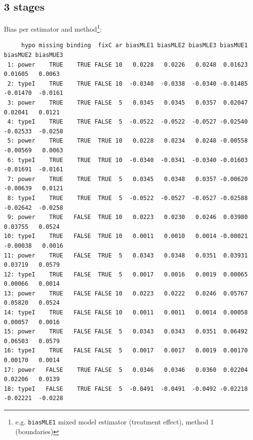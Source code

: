 \documentclass[12pt]{article}
\begin{document}
\subsection{3 stages}
\label{sec:org22a4fe3}
Bias per estimator and method\footnote{e.g. \texttt{biasMLE1} mixed model
estimator (treatment effect), method 1 (boundaries)}:
\begin{adjustwidth}{-1cm}{-1cm}
\begin{verbatim}
     hypo missing binding  fixC ar biasMLE1 biasMLE2 biasMLE3 biasMUE1 biasMUE2 biasMUE3
 1: power    TRUE    TRUE FALSE 10   0.0228   0.0226   0.0248  0.01623  0.01605   0.0063
 2: typeI    TRUE    TRUE FALSE 10  -0.0340  -0.0338  -0.0340 -0.01485 -0.01470  -0.0161
 3: power    TRUE    TRUE FALSE  5   0.0345   0.0345   0.0357  0.02047  0.02041   0.0121
 4: typeI    TRUE    TRUE FALSE  5  -0.0522  -0.0522  -0.0527 -0.02540 -0.02533  -0.0258
 5: power    TRUE    TRUE  TRUE 10   0.0228   0.0234   0.0248 -0.00558 -0.00569   0.0063
 6: typeI    TRUE    TRUE  TRUE 10  -0.0340  -0.0341  -0.0340 -0.01603 -0.01691  -0.0161
 7: power    TRUE    TRUE  TRUE  5   0.0345   0.0348   0.0357 -0.00620 -0.00639   0.0121
 8: typeI    TRUE    TRUE  TRUE  5  -0.0522  -0.0527  -0.0527 -0.02588 -0.02642  -0.0258
 9: power    TRUE   FALSE  TRUE 10   0.0223   0.0230   0.0246  0.03980  0.03755   0.0524
10: typeI    TRUE   FALSE  TRUE 10   0.0011   0.0010   0.0014 -0.00021 -0.00038   0.0016
11: power    TRUE   FALSE  TRUE  5   0.0343   0.0348   0.0351  0.03931  0.03719   0.0579
12: typeI    TRUE   FALSE  TRUE  5   0.0017   0.0016   0.0019  0.00065  0.00066   0.0014
13: power    TRUE   FALSE FALSE 10   0.0223   0.0222   0.0246  0.05767  0.05820   0.0524
14: typeI    TRUE   FALSE FALSE 10   0.0011   0.0011   0.0014  0.00058  0.00057   0.0016
15: power    TRUE   FALSE FALSE  5   0.0343   0.0343   0.0351  0.06492  0.06503   0.0579
16: typeI    TRUE   FALSE FALSE  5   0.0017   0.0017   0.0019  0.00170  0.00170   0.0014
17: power   FALSE    TRUE FALSE  5   0.0346   0.0346   0.0360  0.02204  0.02206   0.0139
18: typeI   FALSE    TRUE FALSE  5  -0.0491  -0.0491  -0.0492 -0.02218 -0.02221  -0.0228
\end{verbatim}
\end{adjustwidth}
\end{document}
